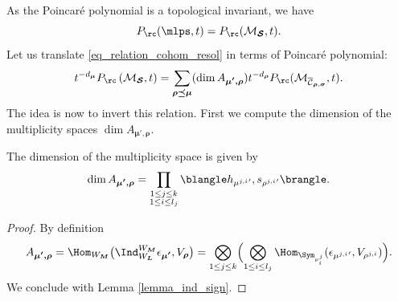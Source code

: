 As the Poincaré polynomial is a topological invariant, we have
\[
P_{\rc}(\mlps,t) = P_{\rc}(\mathcal{M}_{\boldsymbol{\mathcal{S}}},t).
\]
Let us translate \eqref{eq_relation_cohom_resol} in terms of Poincaré polynomial:
\begin{equation}\label{eq_combi_ss_resol}
t^{-d_{\boldsymbol{\mu}}} P_{\rc}\left(\mathcal{M}_{\boldsymbol{\mathcal{S}}},t\right) = \sum_{\boldsymbol{\rho\preceq\mu}}(\dim A_{\boldsymbol{\mu',\rho}}) t^{-d_{\boldsymbol{\rho}}} P_{\rc}(\mathcal{M}_{\overline{\mathcal{C}}_{\boldsymbol{\rho},\boldsymbol{\sigma}}}, t).
\end{equation}
The idea is now to invert this relation. First we compute the dimension of the multiplicity spaces $\dim A_{\boldsymbol{\mu',\rho}}$.
\begin{lemma}\label{lemma_dim_Amurho}
The dimension of the multiplicity space is given by
\[
\dim A_{\boldsymbol{\mu',\rho}} = \prod_{\substack{ 1\le j \le k \\ 1 \le i \le l_j }}\blangle h_{{\mu^{j,i}}'}, s_{ {\rho^{j,i}}' }\brangle.
\]
\end{lemma}
\begin{proof}
By definition
\[
A_{\boldsymbol{\mu',\rho}} = \Hom_{W_{\boldsymbol{M}}}
\bigl(\Ind_{W_{\boldsymbol{L}}}^{W_{\boldsymbol{M}}} \epsilon_{\boldsymbol{\mu'}}, V_{\boldsymbol{\rho}}\bigr)= \bigotimes_{1 \le j \le k} \Bigl(\bigotimes_{1 \le i \le l_j}\Hom_{\Sym_{\nu^j_i}}(\epsilon_{{\mu^{ j,i }}' },V_{\rho^{ j,i }}) \Bigr).
\]
We conclude with Lemma \ref{lemma_ind_sign}.
\end{proof}

